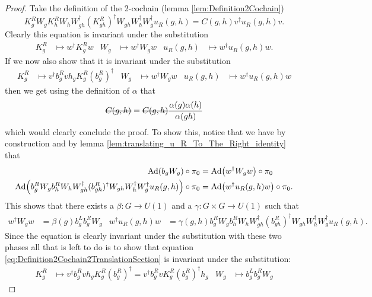 \documentclass[12pt,a4paper,twoside]{article}
\newcommand{\stkout}[1]{\ifmmode\text{\sout{\ensuremath{#1}}}\else\sout{#1}\fi}
\let\originalleft\left
\let\originalright\right
\renewcommand{\left}{\mathopen{}\mathclose\bgroup\originalleft}
\renewcommand{\right}{\aftergroup\egroup\originalright}
\newcommand{\Ad}[1]{\textrm{Ad}\left(#1\right)}
\theoremstyle{definition}
\numberwithin{equation}{section}
\begin{document}
\begin{proof}
	Take the definition of the 2-cochain (lemma \ref{lem:Definition2Cochain})
	\begin{equation}\label{eq:Definition2Cochain2TranslationSection}
		K_g^RW_gK_h^RW_hW_{gh}^\dagger(K_{gh}^R)^\dagger W_{gh}W_{h}^\dagger W_g^\dagger u_R(g,h)=C(g,h)v^\dagger u_R(g,h)v.
	\end{equation}
	Clearly this equation is invariant under the substitution
	\begin{align}
		K_g^R&\mapsto w^\dagger K_g^R w&W_g&\mapsto w^\dagger W_g w&u_R(g,h)&\mapsto w^\dagger u_R(g,h)w.
	\end{align}
	If we now also show that it is invariant under the substitution
	\begin{align}
		K_g^R&\mapsto v^\dagger b_g^R v h_g K_g^R (b_g^R)^\dagger&W_g&\mapsto w^\dagger W_g w&u_R(g,h)&\mapsto w^\dagger u_R(g,h)w
	\end{align}
	then we get using the definition of $\alpha$ that
	\begin{equation}
		\stkout{C(g,h)}=\stkout{C(g,h)}\frac{\alpha(g)\alpha(h)}{\alpha(gh)}
	\end{equation}
	which would clearly conclude the proof. To show this, notice that we have by construction and by lemma \ref{lem:translating_u_R_To_The_Right_identity} that
	\begin{align}
		\Ad{b_g W_g}\circ\pi_0&=\Ad{w^\dagger W_g w}\circ\pi_0\\
		\Ad{b_g^R W_g b_h^R W_h W_{gh}^\dagger (b_{gh}^R)^\dagger W_{gh}W_h^\dagger W_g^\dagger u_R(g,h)}\circ\pi_0&=\Ad{w^\dagger u_R(g,h) w}\circ\pi_0.
	\end{align}
	This shows that there exists a $\beta:G\rightarrow U(1)$ and a $\gamma:G\times G\rightarrow U(1)$ such that
	\begin{align}
		w^\dagger W_g w&=\beta(g)b_g^Lb_g^RW_g&w^\dagger u_R(g,h) w&=\gamma(g,h)b_g^R W_g b_h^R W_h W_{gh}^\dagger (b_{gh}^R)^\dagger W_{gh}W_h^\dagger W_g^\dagger u_R(g,h).
	\end{align}
	Since the equation is clearly invariant under the substitution with these two phases all that is left to do is to show that equation \eqref{eq:Definition2Cochain2TranslationSection} is invariant under the substitution:
	\begin{align}
		K_g^R&\mapsto v^\dagger b_g^R v h_g K_g^R (b_g^R)^\dagger=v^\dagger b_g^R v K_g^R (b_g^R)^\dagger h_g&W_g&\mapsto b_g^Lb_g^RW_g
	\end{align}
	\begin{equation}

\end{equation}
\end{proof}
\end{document}
